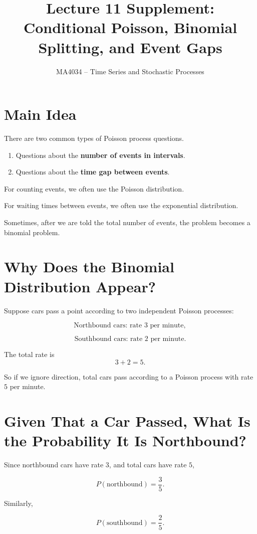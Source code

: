 \documentclass[12pt]{article}
\title{Lecture 11 Supplement: Conditional Poisson, Binomial Splitting, and Event Gaps}
\author{MA4034 -- Time Series and Stochastic Processes}
\date{}
\begin{document}
\maketitle

\section{Main Idea}

There are two common types of Poisson process questions.

\begin{enumerate}
    \item Questions about the \textbf{number of events in intervals}.
    \item Questions about the \textbf{time gap between events}.
\end{enumerate}

For counting events, we often use the Poisson distribution.

For waiting times between events, we often use the exponential distribution.

Sometimes, after we are told the total number of events, the problem becomes a binomial problem.

\section{Why Does the Binomial Distribution Appear?}

Suppose cars pass a point according to two independent Poisson processes:

\[
\text{Northbound cars: rate } 3 \text{ per minute},
\]

\[
\text{Southbound cars: rate } 2 \text{ per minute}.
\]

The total rate is
\[
3+2=5.
\]

So if we ignore direction, total cars pass according to a Poisson process with rate \(5\) per minute.

\section{Given That a Car Passed, What Is the Probability It Is Northbound?}

Since northbound cars have rate \(3\), and total cars have rate \(5\),

\[
P(\text{northbound})=\frac{3}{5}.
\]

Similarly,

\[
P(\text{southbound})=\frac{2}{5}.
\]
\end{document}
